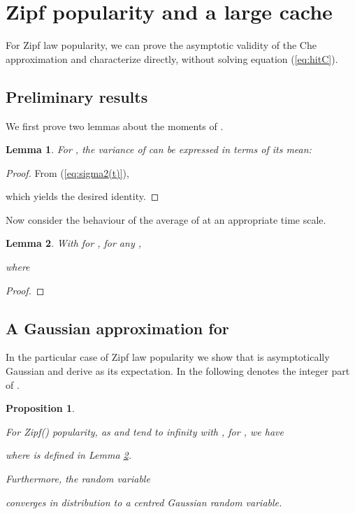 \documentclass{amsart}
\newtheorem{proposition}{Proposition}
\newtheorem{lemma}{Lemma}
\begin{document}
\section{Zipf popularity and a large cache}
\label{sec:largecache}

For Zipf law popularity, we can prove the asymptotic validity of the Che approximation and characterize  directly, without solving equation (\ref{eq:hitC}). 

 
\subsection{Preliminary results}
We first prove two lemmas about the moments of .

\begin{lemma}\label{lem:estvar} For , the variance of  can be expressed in terms of its mean:

\end{lemma}

\begin{proof}
From (\ref{eq:sigma2(t)}),

which yields the desired identity. 
\end{proof}

 
Now consider the behaviour of the average of  at an appropriate time scale.

\begin{lemma}\label{lem:AsympE} 
With  for , for any , 

where 

\end{lemma}

\begin{proof}



\end{proof}


\subsection{A Gaussian approximation for }
In the particular case of Zipf law popularity we show that  is asymptotically Gaussian and derive  as its expectation. In the following  denotes the integer part of .

\begin{proposition}
\label{tclim}

For Zipf() popularity, as  and  tend to infinity with , for , we have

where  is defined in Lemma \ref{lem:AsympE}.

Furthermore, the random variable 

converges in distribution to a centred Gaussian random variable. 
\end{proposition}
\end{document}
